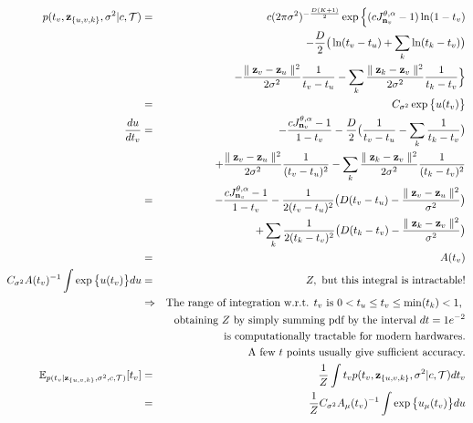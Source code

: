 \documentclass{article}
\begin{document}
	\begin{eqnarray}
	p(t_v, \bold{z}_{\{u,v,k\}}, \sigma^2 | c, \mathcal{T}) & = & c(2 \pi \sigma^2)^{-\frac{D(K + 1)}{2}}\exp \Big\{(cJ^{\theta,\alpha}_{\bold{n}_v} - 1)\ln(1 - t_v) \nonumber \\
	 & & - \frac{D}{2} \big( \ln(t_v - t_u) + \sum_k \ln(t_k - t_v) \big) \nonumber \\
	 & & - \frac{\parallel \bold{z}_v - \bold{z}_u\parallel^2}{2\sigma^2}\frac{1}{t_v - t_u} - \sum_k \frac{\parallel \bold{z}_k - \bold{z}_v\parallel^2}{2\sigma^2}\frac{1}{t_k - t_v} \Big\}  \nonumber\\
	 &=& C_{\sigma^2} \exp \big\{ u(t_v) \big\}\\
	\frac{du}{dt_v} &=& -\frac{cJ^{\theta,\alpha}_{\bold{n}_v} - 1}{1 - t_v} - \frac{D}{2}\big( \frac{1}{t_v - t_u} - \sum_k\frac{1}{t_k - t_v}\big) \nonumber \\
	 & & + \frac{\parallel \bold{z}_v - \bold{z}_u\parallel^2}{2\sigma^2}\frac{1}{(t_v - t_u)^2} - \sum_k \frac{\parallel \bold{z}_k - \bold{z}_v\parallel^2}{2\sigma^2}\frac{1}{(t_k - t_v)^2} \nonumber \\
	 &=& -\frac{cJ^{\theta,\alpha}_{\bold{n}_v} - 1}{1 - t_v} - \frac{1}{2(t_v - t_u)^2} \big(D(t_v - t_u) - \frac{\parallel \bold{z}_v - \bold{z}_u\parallel^2}{\sigma^2} \big) \nonumber \\
	 & & + \sum_k \frac{1}{2(t_k - t_v)^2} \big(D(t_k - t_v) - \frac{\parallel \bold{z}_k - \bold{z}_v\parallel^2}{\sigma^2} \big) \nonumber \\
	 &=& A(t_v)\\
	 C_{\sigma^2} A(t_v)^{-1} \int \exp \big\{u(t_v)\big\}du &=& Z, \textrm{ but this integral is intractable!} \\
	 &\Rightarrow & \textrm{The range of integration w.r.t. $t_v$ is $0 < t_u \leq t_v \leq \min(t_k) < 1$, } \nonumber \\
	 & & \textrm{obtaining $Z$ by simply summing pdf by the interval $dt = 1e^{-2}$} \nonumber \\
	 & & \textrm{is computationally tractable for modern hardwares.} \nonumber \\
	 & & \textrm{A few $t$ points usually give sufficient accuracy.} \nonumber \\
	\mathbb{E}_{p(t_v | \bold{z}_{\{u,v,k\}}, \sigma^2, c, \mathcal{T})}[t_v] &=& \frac{1}{Z} \int t_v p(t_v, \bold{z}_{\{u,v,k\}}, \sigma^2 | c, \mathcal{T}) dt_v \nonumber \\
	&=& \frac{1}{Z} C_{\sigma^2} A_\mu(t_v)^{-1} \int \exp \big\{ u_\mu(t_v)\big\}du
	\end{eqnarray}
	
\end{document}
